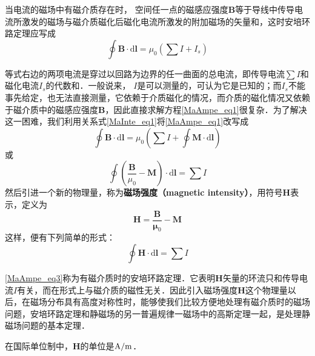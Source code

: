 

当电流的磁场中有磁介质存在时， 空间任一点的磁感应强度$\mathbf B $等于导线中传导电流所激发的磁场与磁介质磁化后磁化电流所激发的附加磁场的矢量和，这时安培环路定理应写成
\begin{equation} \label{MaAmpe_eq1}
\oint \mathbf{B} \cdot \mathrm{d} \mathbf{l}=\mu_{0}\left(\sum I+I_{s}\right)
\end{equation}

等式右边的两项电流是穿过以回路为边界的任一曲面的总电流，即传导电流$\sum I$和磁化电流$I_s$的代数和．一般说来， $I $是可以测量的，可认为它是已知的；而$I_s$不能事先给定，也无法直接测量，它依赖于介质磁化的情况，而介质的磁化情况又依赖于磁介质中的磁感应强度$\mathbf B$，因此直接求解方程\autoref{MaAmpe_eq1}很复杂．为了解决这一困难，我们利用关系式\autoref{MaInte_eq1}将\autoref{MaAmpe_eq1}改写成
\begin{equation}
\oint \mathbf{B} \cdot \mathrm{d} \mathbf{l}=\mu_{0}\left(\sum I+\oint \mathbf{M} \cdot \mathrm{d} \mathbf{l}\right)
\end{equation}
或
\begin{equation}
\oint\left(\frac{\mathbf{B}}{\mu_{0}}-\mathbf{M}\right) \cdot \mathrm{d} \mathbf{l}=\sum I
\end{equation}
然后引进一个新的物理量，称为\textbf{磁场强度（magnetic intensity）}，用符号$\mathbf H$表示，定义为
\begin{equation} \label{MaAmpe_eq2}
\mathbf{H}=\frac{\mathbf{B}}{\mathbf{\mu}_{0}}-\mathbf{M}
\end{equation}
这样，便有下列简单的形式：
\begin{equation} \label{MaAmpe_eq3}
\oint \mathbf{H} \cdot \mathrm{d} \mathbf{l}=\sum I
\end{equation}

\autoref{MaAmpe_eq3}称为有磁介质时的安培环路定理．它表明$\mathbf H $矢量的环流只和传导电流$I $有关，而在形式上与磁介质的磁性无关．因此引入磁场强度$\mathbf H $这个物理量以后，在磁场分布具有高度对称性时，能够使我们比较方便地处理有磁介质时的磁场问题，安培环路定理和静磁场的另一普遍规律一磁场中的高斯定理一起，是处理静磁场问题的基本定理．

在国际单位制中，$\mathbf  H $的单位是$\rm A/m$．

